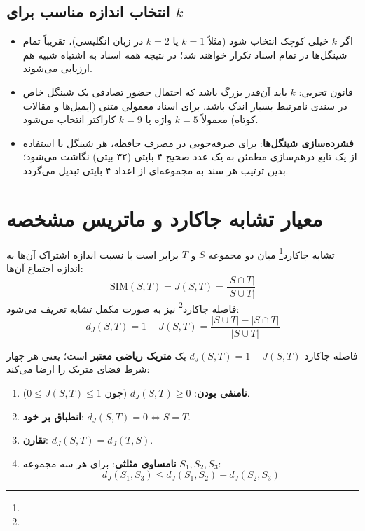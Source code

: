 \subsection{انتخاب اندازه مناسب برای \texorpdfstring{$k$}{k}}
\begin{itemize}
    \item اگر $k$ خیلی کوچک انتخاب شود (مثلاً $k = 1$ یا $k = 2$ در زبان انگلیسی)، تقریباً تمام شینگل‌ها در تمام اسناد تکرار خواهند شد؛ در نتیجه همه اسناد به اشتباه شبیه هم ارزیابی می‌شوند.
    \item قانون تجربی: $k$ باید آن‌قدر بزرگ باشد که احتمال حضور تصادفی یک شینگل خاص در سندی نامرتبط بسیار اندک باشد. برای اسناد معمولی متنی (ایمیل‌ها و مقالات کوتاه) معمولاً $k = 5$ واژه یا $k = 9$ کاراکتر انتخاب می‌شود.
    \item \textbf{فشرده‌سازی شینگل‌ها}: برای صرفه‌جویی در مصرف حافظه، هر شینگل با استفاده از یک تابع درهم‌سازی مطمئن به یک عدد صحیح ۴ بایتی (۳۲ بیتی) نگاشت می‌شود؛ بدین ترتیب هر سند به مجموعه‌ای از اعداد ۴ بایتی تبدیل می‌گردد.
\end{itemize}

\section{معیار تشابه جاکارد و ماتریس مشخصه}

\begin{definition}
تشابه جاکارد\footnote{} میان دو مجموعه $S$ و $T$ برابر است با نسبت اندازه اشتراک آن‌ها به اندازه اجتماع آن‌ها:
\begin{equation}
\text{SIM}(S, T) = J(S, T) = \frac{|S \cap T|}{|S \cup T|}
\end{equation}
فاصله جاکارد\footnote{} نیز به صورت مکمل تشابه تعریف می‌شود:
\begin{equation}
d_J(S, T) = 1 - J(S, T) = \frac{|S \cup T| - |S \cap T|}{|S \cup T|}
\end{equation}
\end{definition}

\begin{theorem}
فاصله جاکارد $d_J(S, T) = 1 - J(S, T)$ یک \textbf{متریک ریاضی معتبر} است؛ یعنی هر چهار شرط فضای متریک را ارضا می‌کند:
\begin{enumerate}
    \item \textbf{نامنفی بودن}: $d_J(S, T) \ge 0$ (چون $0 \le J(S, T) \le 1$).
    \item \textbf{انطباق بر خود}: $d_J(S, T) = 0 \iff S = T$.
    \item \textbf{تقارن}: $d_J(S, T) = d_J(T, S)$.
    \item \textbf{نامساوی مثلثی}: برای هر سه مجموعه $S_1, S_2, S_3$:
    \begin{equation}
    d_J(S_1, S_3) \le d_J(S_1, S_2) + d_J(S_2, S_3)
    \end{equation}
\end{enumerate}
\end{theorem}

